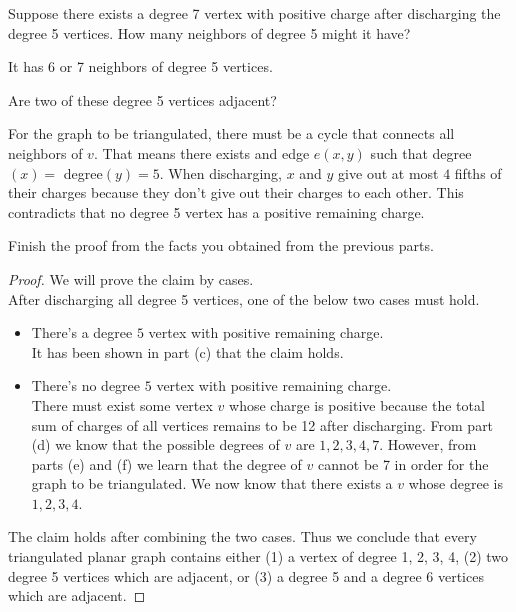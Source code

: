 \documentclass[11pt]{article}
\begin{document}
\begin{Parts}
    \newpage
    \Part Suppose there exists a degree 7 vertex with positive charge after discharging the degree 5 vertices. How many neighbors of degree 5 might it have?
    \begin{Answer}
        It has 6 or 7 neighbors of degree 5 vertices. 
    \end{Answer}

    \Part Are two of these degree 5 vertices adjacent?
    \begin{Answer}
        For the graph to be triangulated, there must be a cycle that connects all neighbors of $v$. That means
        there exists and edge $e(x,y)$ such that degree$(x)=$ degree$(y)=5$. When discharging, $x$ and $y$ 
        give out at most $4$ fifths of their charges because they don't give out their charges to each other. 
        This contradicts that no degree 5 vertex has a positive remaining charge. 
    \end{Answer}

    \Part Finish the proof from the facts you obtained from the previous parts.
    \begin{Answer}
        \begin{proof}
            We will prove the claim by cases.\\
            After discharging all degree 5 vertices, one of the below two cases must hold. 
            \begin{itemize}
                \item There's a degree $5$ vertex with positive remaining charge. \\
                      It has been shown in part (c) that the claim holds. 
                \item There's no degree $5$ vertex with positive remaining charge. \\
                      There must exist some vertex $v$ whose charge is positive because the total sum of charges 
                      of all vertices remains to be 12 after discharging. From part (d) we know that the possible 
                      degrees of $v$ are $1,2,3,4,7$. However, from parts (e) and (f) we learn that the degree of $v$
                      cannot be 7 in order for the graph to be triangulated. We now know that there exists a $v$ 
                      whose degree is $1,2,3,4$. 
            \end{itemize}
            The claim holds after combining the two cases. Thus we conclude that every triangulated planar graph 
            contains either (1) a vertex of degree 1, 2, 3, 4, (2) two degree 5 vertices which are adjacent, or 
            (3) a degree 5 and a degree 6 vertices which are adjacent.
        \end{proof}
    \end{Answer}
\end{Parts}
\end{document}
